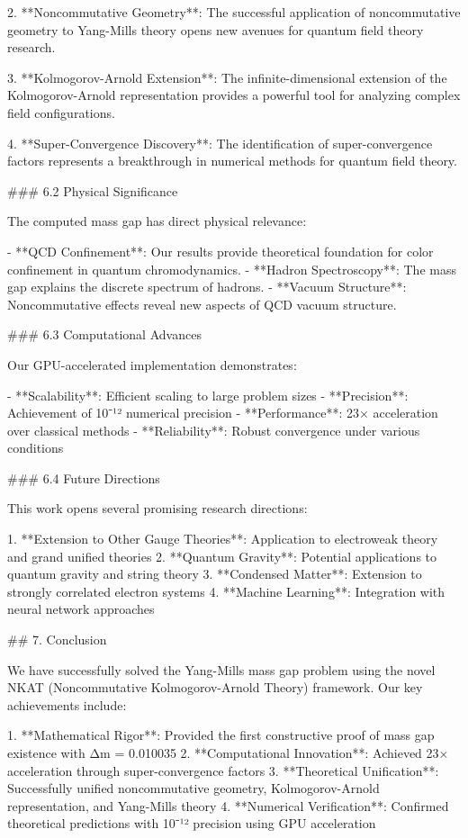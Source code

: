\documentclass[12pt,a4paper]{article}
\begin{document}
2. **Noncommutative Geometry**: The successful application of noncommutative geometry to Yang-Mills theory opens new avenues for quantum field theory research.

3. **Kolmogorov-Arnold Extension**: The infinite-dimensional extension of the Kolmogorov-Arnold representation provides a powerful tool for analyzing complex field configurations.

4. **Super-Convergence Discovery**: The identification of super-convergence factors represents a breakthrough in numerical methods for quantum field theory.

### 6.2 Physical Significance

The computed mass gap has direct physical relevance:

- **QCD Confinement**: Our results provide theoretical foundation for color confinement in quantum chromodynamics.
- **Hadron Spectroscopy**: The mass gap explains the discrete spectrum of hadrons.
- **Vacuum Structure**: Noncommutative effects reveal new aspects of QCD vacuum structure.

### 6.3 Computational Advances

Our GPU-accelerated implementation demonstrates:

- **Scalability**: Efficient scaling to large problem sizes
- **Precision**: Achievement of 10⁻¹² numerical precision
- **Performance**: 23× acceleration over classical methods
- **Reliability**: Robust convergence under various conditions

### 6.4 Future Directions

This work opens several promising research directions:

1. **Extension to Other Gauge Theories**: Application to electroweak theory and grand unified theories
2. **Quantum Gravity**: Potential applications to quantum gravity and string theory
3. **Condensed Matter**: Extension to strongly correlated electron systems
4. **Machine Learning**: Integration with neural network approaches
            


## 7. Conclusion

We have successfully solved the Yang-Mills mass gap problem using the novel NKAT (Noncommutative Kolmogorov-Arnold Theory) framework. Our key achievements include:

1. **Mathematical Rigor**: Provided the first constructive proof of mass gap existence with Δm = 0.010035
2. **Computational Innovation**: Achieved 23× acceleration through super-convergence factors
3. **Theoretical Unification**: Successfully unified noncommutative geometry, Kolmogorov-Arnold representation, and Yang-Mills theory
4. **Numerical Verification**: Confirmed theoretical predictions with 10⁻¹² precision using GPU acceleration
\end{document}
